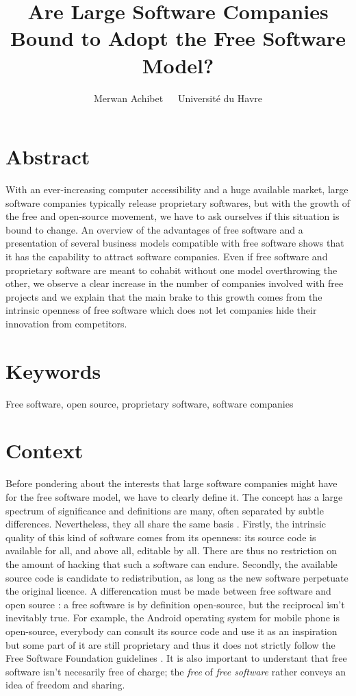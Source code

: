 \documentclass[12pt]{article}
\title{Are Large Software Companies Bound to Adopt the Free Software Model?}
\author{Merwan Achibet $\;$ \textendash $\;$  Université du Havre}
\date{}
\begin{document}
\maketitle

\section*{Abstract}

With an ever-increasing computer accessibility and a huge available
market, large software companies typically release proprietary
softwares, but with the growth of the free and open-source movement,
we have to ask ourselves if this situation is bound to change. An
overview of the advantages of free software and a presentation of
several business models compatible with free software shows that it
has the capability to attract software companies. Even if free
software and proprietary software are meant to cohabit without one
model overthrowing the other, we observe a clear increase in the
number of companies involved with free projects and we explain that
the main brake to this growth comes from the intrinsic openness of
free software which does not let companies hide their innovation from
competitors.

\section*{Keywords}

Free software, open source, proprietary software, software companies

\newpage

\tableofcontents

\newpage

\section{Context}

Before pondering about the interests that large software companies
might have for the free software model, we have to clearly define
it. The concept has a large spectrum of significance and definitions
are many, often separated by subtle differences. Nevertheless, they
all share the same basis \cite{sers}. Firstly, the intrinsic quality
of this kind of software comes from its openness: its source code is
available for all, and above all, editable by all. There are thus no
restriction on the amount of hacking that such a software can
endure. Secondly, the available source code is candidate to
redistribution, as long as the new software perpetuate the original
licence. A differencation must be made between free software and open
source : a free software is by definition open-source, but the
reciprocal isn't inevitably true. For example, the Android operating
system for mobile phone is open-source, everybody can consult its
source code and use it as an inspiration but some part of it are still
proprietary and thus it does not strictly follow the Free Software
Foundation guidelines \cite{and}. It is also important to understant
that free software isn't necesarily free of charge; the \textit{free}
of \textit{free software} rather conveys an idea of freedom and
sharing.
\end{document}
